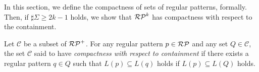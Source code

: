 
In this section, we define the compactness of sets of regular patterns, formally.
Then, if $\sharp\Sigma \ge 2k-1$ holds, 
we show that 
$\mathcal{RP}^{k}$ has compactness with respect to the containment.

\begin{dfn}\label{def:compactness}
Let $\mathcal{C}$ be a subset of $\mathcal{RP}^{+}$. 
For any regular pattern $p \in \mathcal{RP}$ and any set $Q \in \mathcal{C}$,
the set $\mathcal{C}$ said to have {\it compactness with respect to containment}
if there exists a regular pattern $q \in Q$ such that $L(p) \subseteq L(q)$ holds if $L(p) \subseteq L(Q)$ holds.
\end{dfn}

